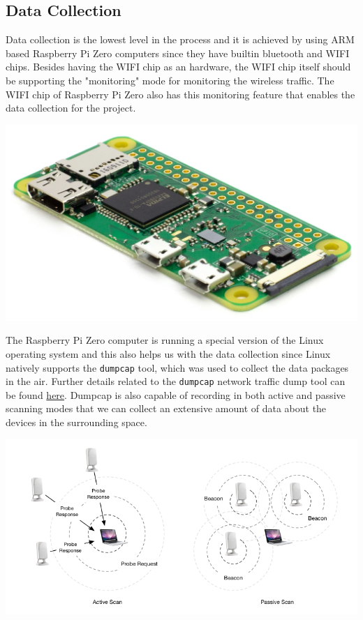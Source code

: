 \documentclass[journal, 12pt]{IEEEtran}
\begin{document}
\subsection{Data Collection}
\noindent Data collection is the lowest level in the process and it is achieved by using ARM based Raspberry Pi Zero computers since they have builtin bluetooth and WIFI chips. Besides having the WIFI chip as an hardware, the WIFI chip itself should be supporting the "monitoring" mode for monitoring the wireless traffic. The WIFI chip of Raspberry Pi Zero also has this monitoring feature that enables the data collection for the project.

\begingroup
    \center
    \medskip
    \includegraphics[width=0.6\columnwidth]{report/interim_report/images/raspi.png}
    \label{fig:raspi}
    \medskip
\endgroup

\noindent The  Raspberry Pi Zero computer is running a special version of the Linux operating system and this also helps us with the data collection since Linux natively supports the \texttt{dumpcap} tool, which was used to collect the data packages in the air. Further details related to the \texttt{dumpcap} network traffic dump tool can be found  \href{https://linux.die.net/man/1/dumpcap}{here}. Dumpcap is also capable of recording in both active and passive scanning modes that we can collect an extensive amount of data about the devices in the surrounding space.

\begingroup
    \center
    \medskip
    \includegraphics[width=\columnwidth]{report/interim_report/images/scan.png}
    \label{fig:scannig_types}
    \medskip
\endgroup
\end{document}

